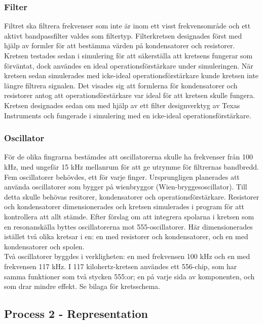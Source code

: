 \documentclass[a4paper]{article}
\begin{document}
\begin{sloppypar}
  \subsubsection{Filter}
  Filtret ska filtrera frekvenser som inte är inom ett visst frekvensområde och ett aktivt bandpassfilter valdes som filtertyp.
  Filterkretsen designades först med hjälp av formler för att bestämma värden på kondensatorer och resistorer.
  Kretsen testades sedan i simulering för att säkerställa att kretsens fungerar som förväntat,
  dock användes en ideal operationsförstärkare under simuleringen.
  När kretsen sedan simulerades med icke-ideal operationsförstärkare kunde kretsen inte längre filtrera signalen.
  Det visades sig att formlerna för kondensatorer och resistorer
  antog att operationsförstärkare var ideal för att kretsen skulle fungera.
  Kretsen designades sedan om med hjälp av ett filter designverktyg av Texas Instruments
  och fungerade i simulering med en icke-ideal operationsförstärkare.

  \subsubsection{Oscillator}
  För de olika fingrarna bestämdes att oscillatorerna skulle ha frekvenser från 100 kHz, med ungefär 15 kHz mellanrum för att ge utrymme för filtrernas bandbredd. Fem oscillatorer behövdes, ett för varje finger.
  Ursprungligen planerades att använda oscillatorer som bygger på wienbryggor (Wien-bryggesoscillator).
  Till detta skulle behövas resitorer, kondensatorer och operationsförstärkare. Resistorer och kondensatorer dimensionerades och kretsen simulerades i program för att kontrollera att allt stämde.
  Efter förslag om att integrera spolarna i kretsen som en resonanskälla byttes oscillatorerna mot 555-oscillatorer.
  Här dimensionerades istället två olika kretsar i en: en med resistorer och kondensatorer, och en med kondensatorer och spolen.
  \\
  Två oscillatorer byggdes i verkligheten: en med frekvensen 100 kHz och en med frekvensen 117 kHz.
  I 117 kilohertz-kretsen användes ett 556-chip, som har samma funktioner som två stycken 555:or; en på varje sida av komponenten, och som drar mindre effekt. Se bilaga för kretsschema.


  \subsection{Process 2 - Representation}


\end{sloppypar}
\end{document}
